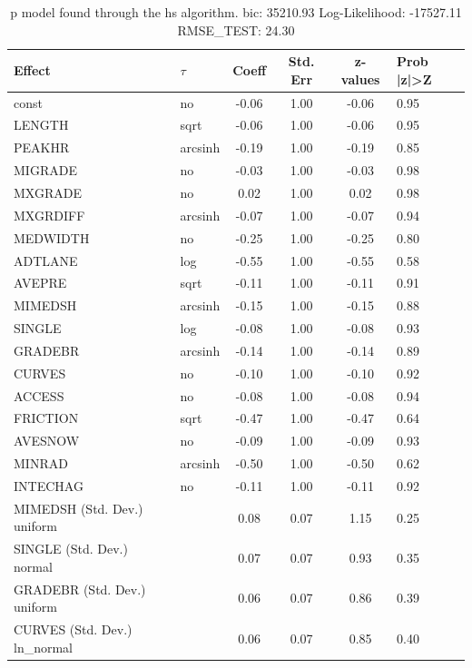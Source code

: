 \begin{table}
	\caption{p model found through the hs algorithm. bic: 35210.93 Log-Likelihood: -17527.11 RMSE_TEST: 24.30}
	\begin{center}
		\begin{tabular}{|l|l|c|c|c|l|}
			\hline
			Effect & $\tau$ & Coeff & Std. Err & z-values & Prob |z|>Z \\
			\hline
			const & no & -0.06 & 1.00 & -0.06 & 0.95 \\
			\hline
			LENGTH & sqrt & -0.06 & 1.00 & -0.06 & 0.95 \\
			\hline
			PEAKHR & arcsinh & -0.19 & 1.00 & -0.19 & 0.85 \\
			\hline
			MIGRADE & no & -0.03 & 1.00 & -0.03 & 0.98 \\
			\hline
			MXGRADE & no & 0.02 & 1.00 & 0.02 & 0.98 \\
			\hline
			MXGRDIFF & arcsinh & -0.07 & 1.00 & -0.07 & 0.94 \\
			\hline
			MEDWIDTH & no & -0.25 & 1.00 & -0.25 & 0.80 \\
			\hline
			ADTLANE & log & -0.55 & 1.00 & -0.55 & 0.58 \\
			\hline
			AVEPRE & sqrt & -0.11 & 1.00 & -0.11 & 0.91 \\
			\hline
			MIMEDSH & arcsinh & -0.15 & 1.00 & -0.15 & 0.88 \\
			\hline
			SINGLE & log & -0.08 & 1.00 & -0.08 & 0.93 \\
			\hline
			GRADEBR & arcsinh & -0.14 & 1.00 & -0.14 & 0.89 \\
			\hline
			CURVES & no & -0.10 & 1.00 & -0.10 & 0.92 \\
			\hline
			ACCESS & no & -0.08 & 1.00 & -0.08 & 0.94 \\
			\hline
			FRICTION & sqrt & -0.47 & 1.00 & -0.47 & 0.64 \\
			\hline
			AVESNOW & no & -0.09 & 1.00 & -0.09 & 0.93 \\
			\hline
			MINRAD & arcsinh & -0.50 & 1.00 & -0.50 & 0.62 \\
			\hline
			INTECHAG & no & -0.11 & 1.00 & -0.11 & 0.92 \\
			\hline
			MIMEDSH (Std. Dev.) uniform &  & 0.08 & 0.07 & 1.15 & 0.25 \\
			\hline
			SINGLE (Std. Dev.) normal &  & 0.07 & 0.07 & 0.93 & 0.35 \\
			\hline
			GRADEBR (Std. Dev.) uniform &  & 0.06 & 0.07 & 0.86 & 0.39 \\
			\hline
			CURVES (Std. Dev.) ln_normal &  & 0.06 & 0.07 & 0.85 & 0.40 \\

\end{tabular}
\end{center}
\end{table}
